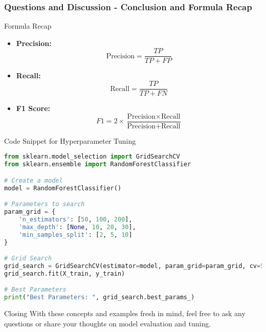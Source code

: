\documentclass[aspectratio=169]{beamer}
\begin{document}
\begin{frame}[fragile]
  \frametitle{Questions and Discussion - Conclusion and Formula Recap}
  \begin{block}{Formula Recap}
    \begin{itemize}
      \item \textbf{Precision:} 
      \begin{equation}
      \text{Precision} = \frac{TP}{TP + FP}
      \end{equation}
  
      \item \textbf{Recall:}
      \begin{equation}
      \text{Recall} = \frac{TP}{TP + FN}
      \end{equation}
  
      \item \textbf{F1 Score:}
      \begin{equation}
      F1 = 2 \times \frac{\text{Precision} \times \text{Recall}}{\text{Precision} + \text{Recall}}
      \end{equation}
    \end{itemize}
  \end{block}

  \begin{block}{Code Snippet for Hyperparameter Tuning}
    \begin{lstlisting}[language=Python]
from sklearn.model_selection import GridSearchCV
from sklearn.ensemble import RandomForestClassifier

# Create a model
model = RandomForestClassifier()

# Parameters to search
param_grid = {
    'n_estimators': [50, 100, 200],
    'max_depth': [None, 10, 20, 30],
    'min_samples_split': [2, 5, 10]
}

# Grid Search
grid_search = GridSearchCV(estimator=model, param_grid=param_grid, cv=5)
grid_search.fit(X_train, y_train)

# Best Parameters
print("Best Parameters: ", grid_search.best_params_)
    \end{lstlisting}
  \end{block}

  \begin{block}{Closing}
    With these concepts and examples fresh in mind, feel free to ask any questions or share your thoughts on model evaluation and tuning.
  \end{block}
\end{frame}
\end{document}
